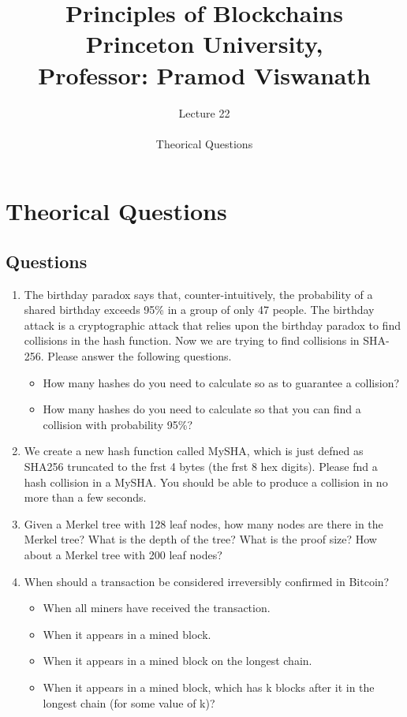 \documentclass{report}
\title{\Huge{Principles of Blockchains \\ Princeton University,\\
		Professor: Pramod Viswanath}}
\author{\huge{Lecture 22} \\\\ Theorical Questions}
\begin{document}
\maketitle
\newpage%
\tableofcontents
\pagebreak

\chapter{Theorical Questions}
\section{Questions}
\begin{enumerate}
	\item The birthday paradox says that, counter-intuitively, the probability of a shared birthday exceeds 95\% in a group of only 47 people. The birthday attack is a cryptographic attack that relies upon the birthday paradox to find collisions in the hash function. Now we are trying to find collisions in SHA-256. Please answer the following questions.
	\begin{itemize}
		\item How many hashes do you need to calculate so as to guarantee a collision?
		\item How many hashes do you need to calculate so that you can find a collision with probability 95\%?
	\end{itemize}
	\item We create a new hash function called MySHA, which is just defned as SHA256 truncated to the frst 4 bytes (the frst 8 hex digits). Please fnd a hash collision in a MySHA. You should be able to produce a collision in no more than a few seconds.
	\item Given a Merkel tree with 128 leaf nodes, how many nodes are there in the Merkel tree? What is the depth of the tree? What is the proof size? How about a Merkel tree with 200 leaf nodes?
	\item When should a transaction be considered irreversibly confirmed in Bitcoin?
	\begin{itemize}
		\item When all miners have received the transaction.
		\item When it appears in a mined block.
		\item When it appears in a mined block on the longest chain.
		\item When it appears in a mined block, which has k blocks after it in the longest chain (for some value of k)?

\end{itemize}
\end{enumerate}
\end{document}
